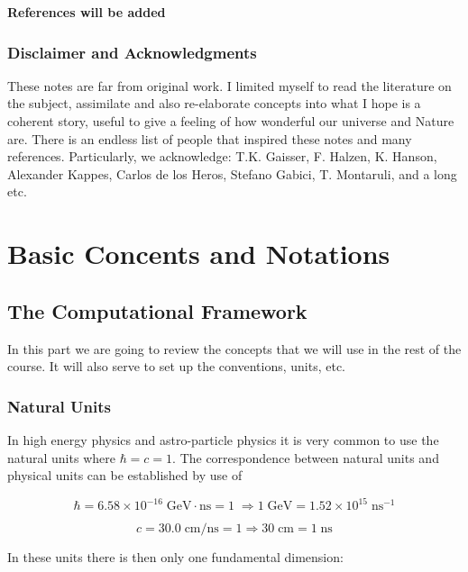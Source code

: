 \documentclass[
  letterpaper,
  DIV=11,
  numbers=noendperiod]{scrreprt}
\begin{document}
\textbf{References will be added}

\subsection*{Disclaimer and
Acknowledgments}\label{disclaimer-and-acknowledgments}

These notes are far from original work. I limited myself to read the
literature on the subject, assimilate and also re-elaborate concepts
into what I hope is a coherent story, useful to give a feeling of how
wonderful our universe and Nature are. There is an endless list of
people that inspired these notes and many references. Particularly, we
acknowledge: T.K. Gaisser, F. Halzen, K. Hanson, Alexander Kappes,
Carlos de los Heros, Stefano Gabici, T. Montaruli, and a long etc.


\chapter{Basic Concents and
Notations}\label{basic-concents-and-notations}

\section{The Computational Framework}\label{the-computational-framework}

In this part we are going to review the concepts that we will use in the
rest of the course. It will also serve to set up the conventions, units,
etc.

\subsection{Natural Units}\label{natural-units}

In high energy physics and astro-particle physics it is very common to
use the natural units where \(\hbar = c = 1\). The correspondence
between natural units and physical units can be established by use of

\[\hbar = 6.58 \times 10^{-16} {\;\mathrm{GeV}\cdot \mathrm{ ns}} = 1\;\Rightarrow 1\;\mathrm{GeV} = 1.52 \times 10^{15}\;{\mathrm{ns}^{-1}}\]

\[c = 30.0\;\mathrm{cm/ns} = 1 \Rightarrow 30\;\mathrm{cm} = 1\;\mathrm{ns}\]

In these units there is then only one fundamental dimension:
\end{document}
